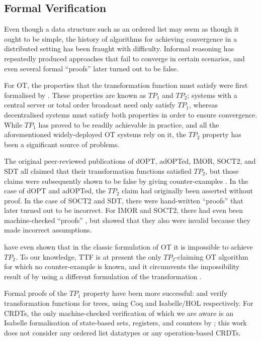 \subsection{Formal Verification}\label{sect.related.verification}

Even though a data structure such as an ordered list may seem as though it ought to be simple, the
history of algorithms for achieving convergence in a distributed setting has been fraught with
difficulty. Informal reasoning has repeatedly produced approaches that fail to converge in certain
scenarios, and even several formal ``proofs'' later turned out to be false.

For OT, the properties that the transformation function must satisfy were first formalised by
\citet{Ressel:1996wx}. These properties are known as $\mathit{TP}_1$ and $\mathit{TP}_2$; systems
with a central server or total order broadcast need only satisfy $\mathit{TP}_1$, whereas
decentralised systems must satisfy both properties in order to ensure convergence. While
$\mathit{TP}_1$ has proved to be readily achievable in practice, and all the aforementioned
widely-deployed OT systems rely on it, the $\mathit{TP}_2$ property has been a significant source of
problems.

The original peer-reviewed publications of dOPT, adOPTed, IMOR, SOCT2, and SDT all claimed that
their transformation functions satisfied $\mathit{TP}_2$, but those claims were subsequently shown
to be false by giving counter-examples \cite{Imine:2003ks,Imine:2006kn,Oster:2005vi}. In the case of
dOPT and adOPTed, the $\mathit{TP}_2$ claim had originally been asserted without proof. In the case
of SOCT2 and SDT, there were hand-written ``proofs'' that later turned out to be incorrect. For IMOR
and SOCT2, there had even been machine-checked ``proofs'' \cite{Imine:2003ks}, but
\citet{Oster:2005vi} showed that they also were invalid because they made incorrect assumptions.

\citet{Randolph:2015gj} have even shown that in the classic formulation of OT it is impossible to
achieve $\mathit{TP}_2$. To our knowledge, TTF is at present the only $\mathit{TP}_2$-claiming OT
algorithm for which no counter-example is known, and it circumvents the impossibility result of
\citet{Randolph:2015gj} by using a different formulation of the transformation
\cite{Oster:2006tr,Levien:2016wz}.

Formal proofs of the $\mathit{TP}_1$ property have been more successful: \citet{Sinchuk:2016cf} and
\citet{Jungnickel:2015ua} verify transformation functions for trees, using Coq and Isabelle/HOL
respectively. For CRDTs, the only machine-checked verification of which we are aware is an Isabelle
formalisation of state-based sets, registers, and counters by \citet{Zeller:2014fl}; this work does
not consider any ordered list datatypes or any operation-based CRDTs.

